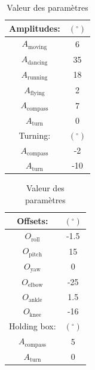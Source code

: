 \documentclass[a4paper,11pt]{scrbook}
\begin{document}
\begin{table}[htbp]
  \centering
  \caption{Valeur des paramètres}
  \label{tab:parameters}
  \begin{tabular}{| c | c |}
  \hline
  Amplitudes: & $(^\circ)$ \\ \hline
  $A_\mathrm{moving}$ & 6 \\ \hline
  $A_\mathrm{dancing}$ & 35 \\ \hline
  $A_\mathrm{running}$ & 18 \\ \hline
  $A_\mathrm{flying}$ & 2 \\ \hline
  $A_\mathrm{compass}$ & 7 \\ \hline
  $A_\mathrm{turn}$ & 0 \\ \hline \hline
  Turning: & $(^\circ)$ \\ \hline
  $A_\mathrm{compass}$ & -2 \\ \hline
  $A_\mathrm{turn}$ & -10 \\ \hline
  \end{tabular}
  \begin{tabular}{| c | c |}
  \hline
  Offsets: & $(^\circ)$ \\ \hline
  $O_\mathrm{roll}$ & -1.5 \\ \hline
  $O_\mathrm{pitch}$ & 15 \\ \hline
  $O_\mathrm{yaw}$ & 0 \\ \hline
  $O_\mathrm{elbow}$ & -25 \\ \hline
  $O_\mathrm{ankle}$ & 1.5 \\ \hline
  $O_\mathrm{knee}$ & -16 \\ \hline \hline
  Holding box: & $(^\circ)$ \\ \hline
  $A_\mathrm{compass}$ & 5 \\ \hline
  $A_\mathrm{turn}$ & 0 \\ \hline
  \end{tabular}
\end{table}



\end{document}
